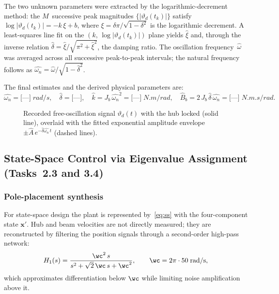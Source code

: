 \documentclass[11pt]{article}
\DeclareRobustCommand{\vect}[1]{ \boldsymbol{#1} }
\newcommand{\thd}{\vartheta_d}
\newcommand{\wn}{\omega_n}
\begin{document}
The two unknown parameters were extracted by the logarithmic-decrement method: the
$M$~successive peak magnitudes $\{|\thd(t_k)|\}$ satisfy
$\log|\thd(t_k)| = -k\,\xi + b$, where $\xi = \delta\pi/\sqrt{1-\delta^2}$ is the
logarithmic decrement.  A least-squares line fit on the
$(k,\,\log|\thd(t_k)|)$ plane yields $\hat{\xi}$ and, through the inverse relation
$\hat{\delta} = \hat{\xi}/\sqrt{\pi^2 + \hat{\xi}^2}$, the damping ratio.
The oscillation frequency~$\hat{\omega}$ was averaged across all successive
peak-to-peak intervals; the natural frequency follows as
$\hat{\wn} = \hat{\omega}/\sqrt{1-\hat{\delta}^2}$.

The final estimates and the derived physical parameters are:
\begin{equation}
    \hat{\wn} = \texttt{[---]}\;\si{rad/s},\quad
    \hat{\delta} = \texttt{[---]},\quad
    \hat{k} = J_b\,\hat{\wn}^2 = \texttt{[---]}\;\si{N.m/rad},\quad
    \hat{B}_b = 2\,J_b\,\hat{\delta}\,\hat{\wn} = \texttt{[---]}\;\si{N.m.s/rad}.
    \label{eq:estimates}
\end{equation}

\begin{figure}[H]
    \centering
    \caption{Recorded free-oscillation signal $\thd(t)$ with the hub locked (solid line),
             overlaid with the fitted exponential amplitude envelope
             $\pm\hat{A}\,e^{-\hat{\delta}\hat{\wn}\,t}$ (dashed lines).}
    \label{fig:free_resp}
\end{figure}

\subsection{State-Space Control via Eigenvalue Assignment (Tasks~2.3 and 3.4)}

\subsubsection*{Pole-placement synthesis}

For state-space design the plant is represented by~\eqref{eq:ss} with the four-component
state $\vect{x}'$.  Hub and beam velocities are not directly measured; they are
reconstructed by filtering the position signals through a second-order high-pass network:
\begin{equation}
    H_1(s) = \frac{\wc^2\,s}{s^2 + \sqrt{2}\,\wc\,s + \wc^2},
    \qquad \wc = 2\pi\cdot 50\;\si{rad/s},
    \label{eq:hpf}
\end{equation}
which approximates differentiation below $\wc$ while limiting noise amplification above it.
\end{document}
